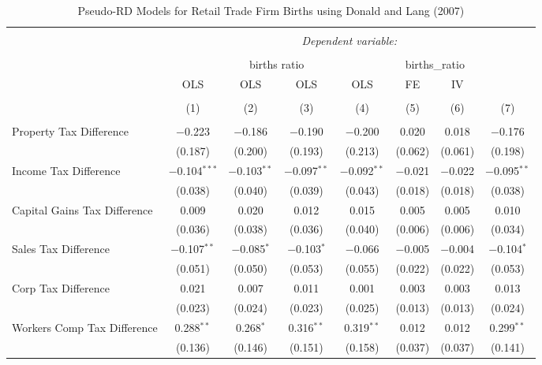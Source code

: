 
\begin{table}[!htbp] \centering 
  \caption{Pseudo-RD Models for  Retail Trade Firm Births using Donald and Lang (2007)} 
  \label{} 
\begin{tabular}{@{\extracolsep{5pt}}lccccccc} 
\\[-1.8ex]\hline 
\hline \\[-1.8ex] 
 & \multicolumn{7}{c}{\textit{Dependent variable:}} \\ 
\cline{2-8} 
\\[-1.8ex] & \multicolumn{4}{c}{births ratio} & \multicolumn{2}{c}{births\_ratio} &   \\ 
 & OLS & OLS & OLS & OLS & FE & IV &  \\ 
\\[-1.8ex] & (1) & (2) & (3) & (4) & (5) & (6) & (7)\\ 
\hline \\[-1.8ex] 
 Property Tax Difference & $-$0.223 & $-$0.186 & $-$0.190 & $-$0.200 & 0.020 & 0.018 & $-$0.176 \\ 
  & (0.187) & (0.200) & (0.193) & (0.213) & (0.062) & (0.061) & (0.198) \\ 
  Income Tax Difference & $-$0.104$^{***}$ & $-$0.103$^{**}$ & $-$0.097$^{**}$ & $-$0.092$^{**}$ & $-$0.021 & $-$0.022 & $-$0.095$^{**}$ \\ 
  & (0.038) & (0.040) & (0.039) & (0.043) & (0.018) & (0.018) & (0.038) \\ 
  Capital Gains Tax Difference & 0.009 & 0.020 & 0.012 & 0.015 & 0.005 & 0.005 & 0.010 \\ 
  & (0.036) & (0.038) & (0.036) & (0.040) & (0.006) & (0.006) & (0.034) \\ 
  Sales Tax Difference & $-$0.107$^{**}$ & $-$0.085$^{*}$ & $-$0.103$^{*}$ & $-$0.066 & $-$0.005 & $-$0.004 & $-$0.104$^{*}$ \\ 
  & (0.051) & (0.050) & (0.053) & (0.055) & (0.022) & (0.022) & (0.053) \\ 
  Corp Tax Difference & 0.021 & 0.007 & 0.011 & 0.001 & 0.003 & 0.003 & 0.013 \\ 
  & (0.023) & (0.024) & (0.023) & (0.025) & (0.013) & (0.013) & (0.024) \\ 
  Workers Comp Tax Difference & 0.288$^{**}$ & 0.268$^{*}$ & 0.316$^{**}$ & 0.319$^{**}$ & 0.012 & 0.012 & 0.299$^{**}$ \\ 
  & (0.136) & (0.146) & (0.151) & (0.158) & (0.037) & (0.037) & (0.141) \\ 

\end{tabular}
\end{table}
